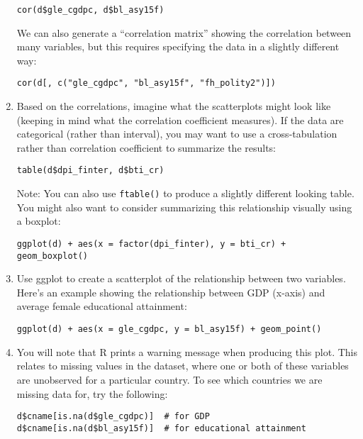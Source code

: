 \documentclass[a4paper,12pt]{article}
\begin{document}
\begin{enumerate}
\begin{verbatim}
cor(d$gle_cgdpc, d$bl_asy15f)
\end{verbatim}

\noindent We can also generate a ``correlation matrix'' showing the correlation between many variables, but this requires specifying the data in a slightly different way:

\begin{verbatim}
cor(d[, c("gle_cgdpc", "bl_asy15f", "fh_polity2")])
\end{verbatim}

\item Based on the correlations, imagine what the scatterplots might look like (keeping in mind what the correlation coefficient measures). If the data are categorical (rather than interval), you may want to use a cross-tabulation rather than correlation coefficient to summarize the results:

\begin{verbatim}
table(d$dpi_finter, d$bti_cr)
\end{verbatim}

\noindent Note: You can also use \texttt{ftable()} to produce a slightly different looking table. You might also want to consider summarizing this relationship visually using a boxplot:

\begin{verbatim}
ggplot(d) + aes(x = factor(dpi_finter), y = bti_cr) + geom_boxplot()
\end{verbatim}

\item Use ggplot to create a scatterplot of the relationship between two variables. Here's an example showing the relationship between GDP (x-axis) and average female educational attainment:

\begin{verbatim}
ggplot(d) + aes(x = gle_cgdpc, y = bl_asy15f) + geom_point()
\end{verbatim}

\item You will note that R prints a warning message when producing this plot. This relates to missing values in the dataset, where one or both of these variables are unobserved for a particular country. To see which countries we are missing data for, try the following:

\begin{verbatim}
d$cname[is.na(d$gle_cgdpc)]  # for GDP
d$cname[is.na(d$bl_asy15f)]  # for educational attainment
\end{verbatim}


\end{enumerate}
\end{document}
